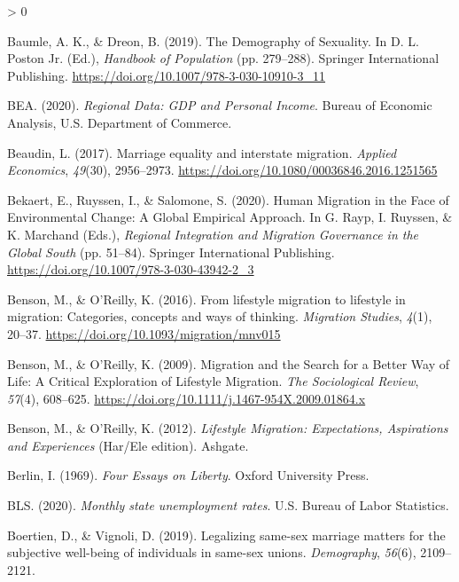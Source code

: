 \documentclass[
  12pt,
]{article}
\newlength{\cslhangindent}
\newenvironment{CSLReferences}[2] %
 {%
  \setlength{\parindent}{0pt}
  \ifodd #1 \everypar{\setlength{\hangindent}{\cslhangindent}}\ignorespaces\fi
  \ifnum #2 > 0
  \setlength{\parskip}{#2\baselineskip}
  \fi
 }%
 {}
\begin{document}
\begin{CSLReferences}{1}{0}
\leavevmode\hypertarget{ref-baumle_2019}{}%
Baumle, A. K., \& Dreon, B. (2019). The {Demography} of {Sexuality}. In D. L. Poston Jr. (Ed.), \emph{Handbook of {Population}} (pp. 279--288). {Springer International Publishing}. \url{https://doi.org/10.1007/978-3-030-10910-3_11}

\leavevmode\hypertarget{ref-bea_2020}{}%
BEA. (2020). \emph{Regional {Data}: {GDP} and {Personal Income}}. {Bureau of Economic Analysis, U.S. Department of Commerce}.

\leavevmode\hypertarget{ref-beaudin_2017}{}%
Beaudin, L. (2017). Marriage equality and interstate migration. \emph{Applied Economics}, \emph{49}(30), 2956--2973. \url{https://doi.org/10.1080/00036846.2016.1251565}

\leavevmode\hypertarget{ref-bekaert_2020}{}%
Bekaert, E., Ruyssen, I., \& Salomone, S. (2020). Human {Migration} in the {Face} of {Environmental Change}: A {Global Empirical Approach}. In G. Rayp, I. Ruyssen, \& K. Marchand (Eds.), \emph{Regional {Integration} and {Migration Governance} in the {Global South}} (pp. 51--84). {Springer International Publishing}. \url{https://doi.org/10.1007/978-3-030-43942-2_3}

\leavevmode\hypertarget{ref-benson_2016}{}%
Benson, M., \& O'Reilly, K. (2016). From lifestyle migration to lifestyle in migration: Categories, concepts and ways of thinking. \emph{Migration Studies}, \emph{4}(1), 20--37. \url{https://doi.org/10.1093/migration/mnv015}

\leavevmode\hypertarget{ref-benson_2009}{}%
Benson, M., \& O'Reilly, K. (2009). Migration and the {Search} for a {Better Way} of {Life}: A {Critical Exploration} of {Lifestyle Migration}. \emph{The Sociological Review}, \emph{57}(4), 608--625. \url{https://doi.org/10.1111/j.1467-954X.2009.01864.x}

\leavevmode\hypertarget{ref-benson_2012}{}%
Benson, M., \& O'Reilly, K. (2012). \emph{Lifestyle {Migration}: Expectations, {Aspirations} and {Experiences}} (Har/Ele edition). {Ashgate}.

\leavevmode\hypertarget{ref-berlin_1969_four}{}%
Berlin, I. (1969). \emph{Four {Essays} on {Liberty}}. {Oxford University Press}.

\leavevmode\hypertarget{ref-bls_2020}{}%
BLS. (2020). \emph{Monthly state unemployment rates}. {U.S. Bureau of Labor Statistics}.

\leavevmode\hypertarget{ref-boertien_2019}{}%
Boertien, D., \& Vignoli, D. (2019). Legalizing same-sex marriage matters for the subjective well-being of individuals in same-sex unions. \emph{Demography}, \emph{56}(6), 2109--2121.


\end{CSLReferences}
\end{document}
